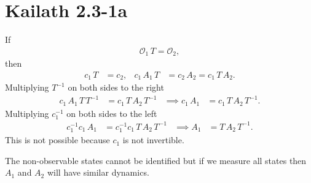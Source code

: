 \section{Kailath 2.3-1a} 

If 
\begin{align*}
    \mathcal{O}_1\,T = \mathcal{O}_2, 
\end{align*}
then 
\begin{align*}
    c_1\,T &= c_2, & c_1\,A_1\,T &= c_2\,A_2 = c_1\,T\,A_2.
\end{align*}
Multiplying $T^{-1}$ on both sides to the right
\begin{align*}
    c_1\,A_1\,T\,T^{-1} &= c_1\,T\,A_2\,T^{-1} & \implies c_1\,A_1 &= c_1\,T\,A_2\,T^{-1}.
\end{align*}
Multiplying $c_1^{-1}$ on both sides to the left
\begin{align*}
    c_1^{-1}c_1\,A_1 &= c_1^{-1}c_1\,T\,A_2\,T^{-1} & \implies A_1 &= T\,A_2\,T^{-1}.
\end{align*}
This is not possible because $c_1$ is not invertible.

The non-observable states cannot be identified but if we measure all states then $A_1$ and $A_2$ will have similar dynamics. 